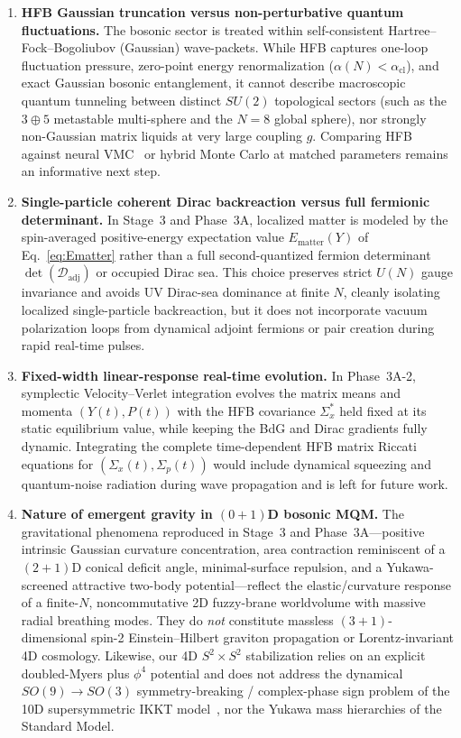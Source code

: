 \documentclass[11pt,a4paper]{article}
\begin{document}
\begin{enumerate}
  \item \textbf{HFB Gaussian truncation versus non-perturbative quantum fluctuations.}
  The bosonic sector is treated within self-consistent Hartree--Fock--Bogoliubov (Gaussian) wave-packets. While HFB captures one-loop fluctuation pressure, zero-point energy renormalization ($\alpha(N) < \alpha_{\mathrm{cl}}$), and exact Gaussian bosonic entanglement, it cannot describe macroscopic quantum tunneling between distinct $SU(2)$ topological sectors (such as the $3\oplus 5$ metastable multi-sphere and the $N=8$ global sphere), nor strongly non-Gaussian matrix liquids at very large coupling $g$. Comparing HFB against neural VMC~\cite{Han2020} or hybrid Monte Carlo at matched parameters remains an informative next step.

  \item \textbf{Single-particle coherent Dirac backreaction versus full fermionic determinant.}
  In Stage~3 and Phase~3A, localized matter is modeled by the spin-averaged positive-energy expectation value $E_{\mathrm{matter}}(Y)$ of Eq.~\eqref{eq:Ematter} rather than a full second-quantized fermion determinant $\det(\mathcal{D}_{\mathrm{adj}})$ or occupied Dirac sea. This choice preserves strict $U(N)$ gauge invariance and avoids UV Dirac-sea dominance at finite $N$, cleanly isolating localized single-particle backreaction, but it does not incorporate vacuum polarization loops from dynamical adjoint fermions or pair creation during rapid real-time pulses.

  \item \textbf{Fixed-width linear-response real-time evolution.}
  In Phase~3A-2, symplectic Velocity--Verlet integration evolves the matrix means and momenta $(Y(t), P(t))$ with the HFB covariance $\Sigma_x^*$ held fixed at its static equilibrium value, while keeping the BdG and Dirac gradients fully dynamic. Integrating the complete time-dependent HFB matrix Riccati equations for $(\Sigma_x(t), \Sigma_p(t))$ would include dynamical squeezing and quantum-noise radiation during wave propagation and is left for future work.

  \item \textbf{Nature of emergent gravity in $(0+1)$D bosonic MQM.}
  The gravitational phenomena reproduced in Stage~3 and Phase~3A---positive intrinsic Gaussian curvature concentration, area contraction reminiscent of a $(2+1)$D conical deficit angle, minimal-surface repulsion, and a Yukawa-screened attractive two-body potential---reflect the elastic/curvature response of a finite-$N$, noncommutative 2D fuzzy-brane worldvolume with massive radial breathing modes. They do \emph{not} constitute massless $(3+1)$-dimensional spin-2 Einstein--Hilbert graviton propagation or Lorentz-invariant 4D cosmology. Likewise, our 4D $S^2\times S^2$ stabilization relies on an explicit doubled-Myers plus $\phi^4$ potential and does not address the dynamical $SO(9)\to SO(3)$ symmetry-breaking / complex-phase sign problem of the 10D supersymmetric IKKT model~\cite{Ishibashi1997}, nor the Yukawa mass hierarchies of the Standard Model.


\end{enumerate}
\end{document}
